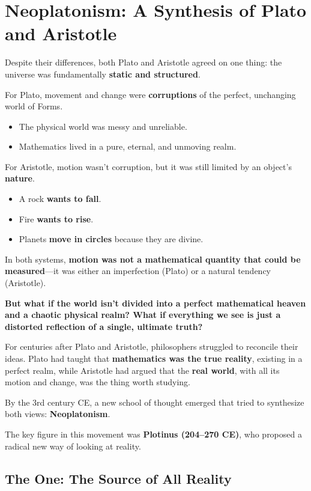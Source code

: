 \section{Neoplatonism: A Synthesis of Plato and Aristotle}

Despite their differences, both Plato and Aristotle agreed on one thing: the universe was fundamentally \textbf{static and structured}.

For Plato, movement and change were \textbf{corruptions} of the perfect, unchanging world of Forms.

\begin{itemize}
    \item The physical world was messy and unreliable.
    \item Mathematics lived in a pure, eternal, and unmoving realm.
\end{itemize}

For Aristotle, motion wasn’t corruption, but it was still limited by an object’s \textbf{nature}.

\begin{itemize}
    \item A rock \textbf{wants to fall}.
    \item Fire \textbf{wants to rise}.
    \item Planets \textbf{move in circles} because they are divine.
\end{itemize}

In both systems, \textbf{motion was not a mathematical quantity that could be measured}—it was either an imperfection (Plato) or a natural tendency (Aristotle).


\textbf{But what if the world isn’t divided into a perfect mathematical heaven and a chaotic physical realm? What if everything we see is just a distorted reflection of a single, ultimate truth?}

For centuries after Plato and Aristotle, philosophers struggled to reconcile their ideas. Plato had taught that \textbf{mathematics was the true reality}, existing in a perfect realm, while Aristotle had argued that the \textbf{real world}, with all its motion and change, was the thing worth studying.

By the 3rd century CE, a new school of thought emerged that tried to synthesize both views: \textbf{Neoplatonism}.

The key figure in this movement was \textbf{Plotinus (204–270 CE)}, who proposed a radical new way of looking at reality.

\subsection{The One: The Source of All Reality}

